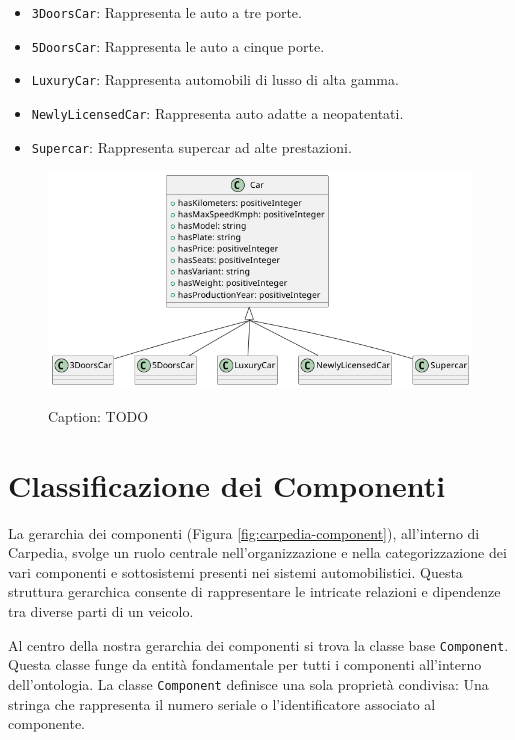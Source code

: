 \begin{itemize}
    \item \texttt{3DoorsCar}: Rappresenta le auto a tre porte.
    \item \texttt{5DoorsCar}: Rappresenta le auto a cinque porte.
    \item \texttt{LuxuryCar}: Rappresenta automobili di lusso di alta gamma.
    \item \texttt{NewlyLicensedCar}: Rappresenta auto adatte a neopatentati.
    \item \texttt{Supercar}: Rappresenta supercar ad alte prestazioni.
\end{itemize}

\begin{figure}[H]
    \caption{Caption: TODO}
    \includegraphics[width=\textwidth]{figures/carpedia-car.png}
    \label{fig:carpedia-car}
\end{figure}

\section{Classificazione dei Componenti}

La gerarchia dei componenti (Figura \ref{fig:carpedia-component}), all'interno di Carpedia, svolge un ruolo centrale nell'organizzazione e nella categorizzazione dei vari componenti e sottosistemi presenti nei sistemi automobilistici. Questa struttura gerarchica consente di rappresentare le intricate relazioni e dipendenze tra diverse parti di un veicolo.

Al centro della nostra gerarchia dei componenti si trova la classe base \texttt{Component}. Questa classe funge da entità fondamentale per tutti i componenti all'interno dell'ontologia. La classe \texttt{Component} definisce una sola proprietà condivisa: Una stringa che rappresenta il numero seriale o l'identificatore associato al componente.

